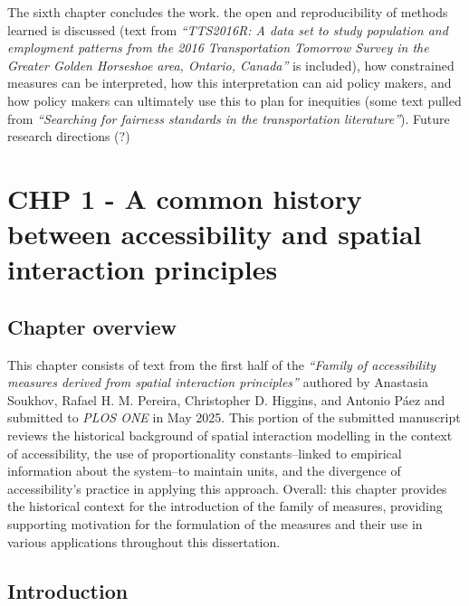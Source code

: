 \documentclass[
11pt, %
oneside, %
english, %
singlespacing, %
]{macthesis} %
\begin{document}
The sixth chapter concludes the work. the open and reproducibility of methods learned is discussed (text from \emph{``TTS2016R: A data set to study population and employment patterns from the 2016 Transportation Tomorrow Survey in the Greater Golden Horseshoe area, Ontario, Canada''} is included), how constrained measures can be interpreted, how this interpretation can aid policy makers, and how policy makers can ultimately use this to plan for inequities (some text pulled from \emph{``Searching for fairness standards in the transportation literature''}). Future research directions (?)

\chapter{CHP 1 - A common history between accessibility and spatial interaction principles}\label{chp-1---a-common-history-between-accessibility-and-spatial-interaction-principles}

\section{Chapter overview}\label{chapter-overview}

This chapter consists of text from the first half of the \emph{``Family of accessibility measures derived from spatial interaction principles''} authored by Anastasia Soukhov, Rafael H. M. Pereira, Christopher D. Higgins, and Antonio Páez and submitted to \emph{PLOS ONE} in May 2025. This portion of the submitted manuscript reviews the historical background of spatial interaction modelling in the context of accessibility, the use of proportionality constants--linked to empirical information about the system--to maintain units, and the divergence of accessibility's practice in applying this approach. Overall: this chapter provides the historical context for the introduction of the family of measures, providing supporting motivation for the formulation of the measures and their use in various applications throughout this dissertation.

\section{Introduction}\label{introduction}
\end{document}
